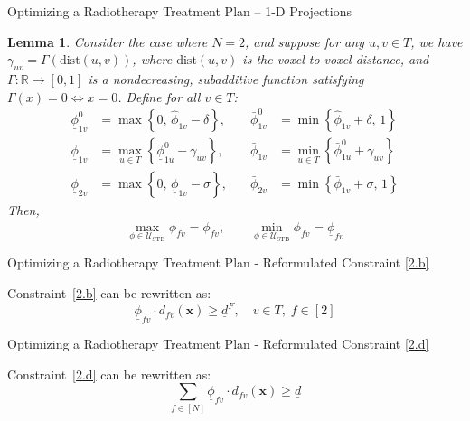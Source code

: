 \documentclass[11pt]{beamer}
\newcommand{\stb}{\mathcal{U}_{\text{STB}}}
\newtheorem{customlemma}{Lemma}
\begin{document}
\begin{frame}{Optimizing a Radiotherapy Treatment Plan – 1-D Projections}
    \tiny{
    \begin{customlemma}\label{lem:1-d projection}
        Consider the case where \( N = 2 \), and suppose for any \( u, v \in T \), we have \( \gamma_{uv} = \Gamma(\text{dist}(u, v)) \), where \( \text{dist}(u, v) \) is the voxel-to-voxel distance, and \( \Gamma : \mathbb{R} \to [0, 1] \) is a nondecreasing, subadditive function satisfying \( \Gamma(x) = 0 \iff x = 0 \).
        Define for all \( v \in T \):
        \begin{align}
            \underline{\phi}_{1v}^0 &= \max\left\{ 0,\, \hat{\phi}_{1v} - \delta \right\}, 
            & \quad \bar{\phi}_{1v}^0 &= \min\left\{ \hat{\phi}_{1v} + \delta,\, 1 \right\} \label{phi0} \\[0.8em]
            \underline{\phi}_{1v} &= \max_{u \in T} \left\{ \underline{\phi}_{1u}^0 - \gamma_{uv} \right\},
            & \quad \bar{\phi}_{1v} &= \min_{u \in T} \left\{ \bar{\phi}_{1u}^0 + \gamma_{uv} \right\} \label{phibar} \\[0.8em]
            \underline{\phi}_{2v} &= \max\left\{ 0,\, \underline{\phi}_{1v} - \sigma \right\},
            & \quad \bar{\phi}_{2v} &= \min\left\{ \bar{\phi}_{1v} + \sigma,\, 1 \right\} \label{phiubar}
        \end{align}
        Then,
        \[
        \max_{\phi \in \stb} \phi_{fv} = \bar{\phi}_{fv}, \qquad
        \min_{\phi \in \stb} \phi_{fv} = \underline{\phi}_{fv}
        \]
        \end{customlemma}
    }
\end{frame}

\begin{frame}{Optimizing a Radiotherapy Treatment Plan - Reformulated Constraint \ref{2.b}}
    \begin{corollary}
    Constraint~\ref{2.b} can be rewritten as:
    \[
    \underline{\phi}_{fv} \cdot d_{fv}(\mathbf{x}) \ge \underline{d}^F, \quad v \in T,\; f \in [2] \tag{3.b}
    \]
    \end{corollary}
\end{frame}

\begin{frame}
    {Optimizing a Radiotherapy Treatment Plan - Reformulated Constraint \ref{2.d}}
    \vspace{1em}

    \begin{corollary}
    Constraint~\ref{2.d} can be rewritten as:
    \[
    \sum_{f \in [N]} \underline{\phi}_{fv} \cdot d_{fv}(\mathbf{x}) \ge \underline{d} \tag{3.d}
    \]
    \end{corollary}
\end{frame}
\end{document}
